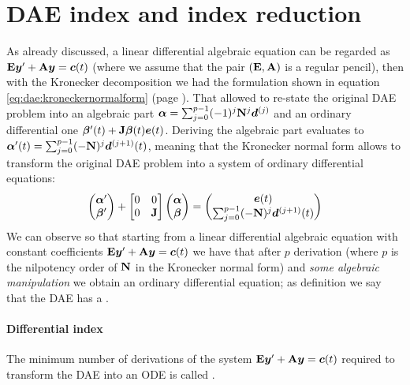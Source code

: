 \section{DAE index and index reduction}
	As already discussed, a linear differential algebraic equation can be regarded as $\mathbf{E} \boldsymbol{y} ' + \mathbf{A} \boldsymbol{y} = \boldsymbol{c}(t)$ (where we assume that the pair $(\mathbf{E},\mathbf{A})$ is a regular pencil), then with the Kronecker decomposition we had the formulation shown in equation \ref{eq:dae:kroneckernormalform} (page \pageref{eq:dae:kroneckernormalform}).  That allowed to re-state the original DAE problem into an algebraic part $\boldsymbol{\alpha} = \sum_{j=0}^{p-1} (-1)^j \mathbf{N}^j \boldsymbol{d}^{(j)}$ and an ordinary differential one $\boldsymbol{\beta}'(t) + \mathbf{J} \boldsymbol{\beta}(t) \boldsymbol{e}(t)$. Deriving the algebraic part evaluates to $\boldsymbol{\alpha}'(t) = \sum_{j=0}^{p-1} (-\mathbf{N})^{j} \boldsymbol{d}^{(j+1)}(t)$, meaning that the Kronecker normal form allows to transform the original DAE problem into a system of ordinary differential equations:
	\begin{equation}
		\begin{pmatrix} \boldsymbol{\alpha}' \\ \boldsymbol{\beta}' \end{pmatrix} + \begin{bmatrix} 0 & 0 \\ 0 &  \mathbf{J} \end{bmatrix} \begin{pmatrix}  \boldsymbol{\alpha} \\ \boldsymbol{\beta} \end{pmatrix} = \begin{pmatrix} \boldsymbol{e}(t) \\ \sum_{j=0}^{p-1} (-\mathbf{N})^{j} \boldsymbol{d}^{(j+1)}(t)  \end{pmatrix}
	\end{equation}
	We can observe so that starting from a linear differential algebraic equation with constant coefficients  $\mathbf{E} \boldsymbol{y} ' + \mathbf{A} \boldsymbol{y} = \boldsymbol{c}(t)$ we have that after $p$ derivation (where $p$ is the nilpotency order of $\mathbf{N}$ in the Kronecker normal form) and \textit{some algebraic manipulation} we obtain an ordinary differential equation; as definition we say that the DAE has a .
	
	\paragraph{Differential index} The minimum number of derivations of the system $\mathbf{E} \boldsymbol{y} ' + \mathbf{A} \boldsymbol{y} = \boldsymbol{c}(t)$ required to transform the DAE into an ODE is called .
	

